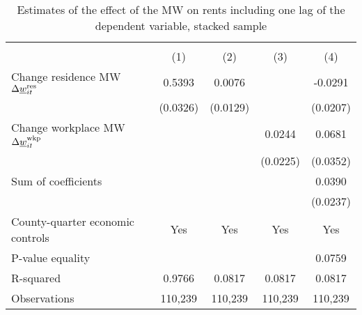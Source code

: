 \begin{table}[hbt!] \centering
    \caption{Estimates of the effect of the MW on rents including one lag of the 
             dependent variable, stacked sample}
    \label{tab:stacked_w6}
    \begin{tabular}{l*{4}{c}}
        \toprule
        & 
            &  \\ \cmidrule(lr){2-2}\cmidrule(lr){3-5}
                                            & (1)   & (2)   & (3)   & (4)            \\ \midrule
        Change residence MW 
                    $\Delta\underline{w}_{it}^{\text{res}}$  &  0.5393  &  0.0076  &       &  -0.0291     \\
                                            & (0.0326) & (0.0129) &       & (0.0207)    \\
        Change workplace MW 
                    $\Delta\underline{w}_{it}^{\text{wkp}}$ &       &       &  0.0244  & 0.0681      \\
                                            &       &       & (0.0225) & (0.0352)    \\ \midrule
        Sum of coefficients                &       &       &       &  0.0390     \\
                                            &       &       &       & (0.0237)    \\ \midrule
        County-quarter economic controls   &  Yes  & Yes   & Yes   & Yes      \\
        P-value equality                   &       &       &       & 0.0759      \\
        R-squared                          &  0.9766  &  0.0817  &  0.0817  & 0.0817      \\
        Observations                       & 110,239  & 110,239  & 110,239  & 110,239     \\\bottomrule
    \end{tabular}


\end{table}
